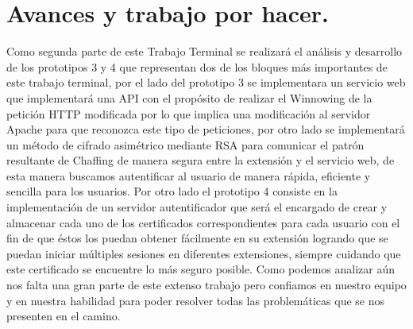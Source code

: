 \documentclass[12pt, a4paper, titlepage]{report}
\begin{document}
        	
	\newpage
	\chapter{\textcolor{azulescom}{Avances y trabajo por hacer.}}
	    Como segunda parte de este Trabajo Terminal se realizará el análisis y desarrollo de los prototipos 3 y 4 que representan dos de los bloques más importantes de este trabajo terminal, por el lado del prototipo 3 se implementara un servicio web que implementará una API con el propósito de realizar el Winnowing de la petición HTTP modificada por lo que implica una modificación al servidor Apache para que reconozca este tipo de peticiones, por otro lado se implementará un método de cifrado asimétrico mediante RSA para comunicar el patrón resultante de Chaffing de manera segura entre la extensión y el servicio web, de esta manera buscamos autentificar al usuario de manera rápida, eficiente y sencilla para los usuarios. Por otro lado el prototipo 4 consiste en la implementación de un servidor autentificador que será el encargado de crear y  almacenar cada uno de los certificados correspondientes para cada usuario con el fin de que éstos los puedan obtener fácilmente en su extensión logrando que se puedan iniciar múltiples sesiones en diferentes extensiones, siempre cuidando que este certificado se encuentre lo más seguro posible.
	    Como podemos analizar aún nos falta una gran parte de este extenso trabajo pero confiamos en nuestro equipo y en nuestra habilidad para poder resolver todas las problemáticas que se nos presenten en el camino.
	\newpage
	
\end{document}
